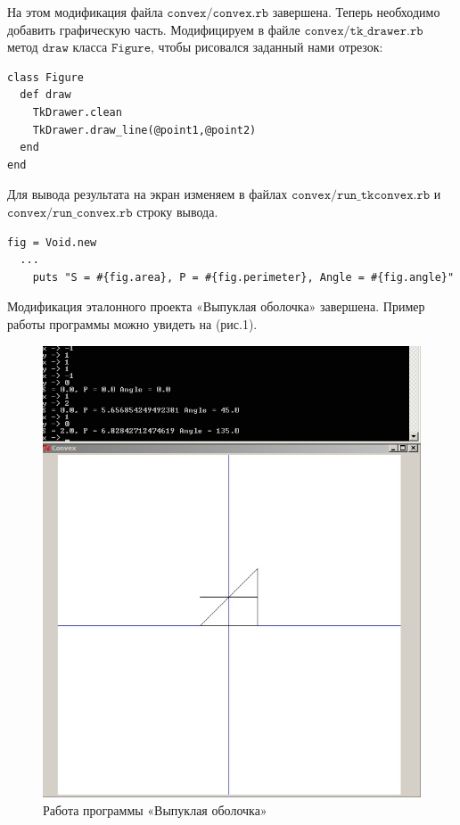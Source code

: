 На этом модификация файла $\texttt{convex/convex.rb}$ завершена. Теперь необходимо добавить графическую часть. Модифицируем в файле \sloppy $\texttt{convex/tk\_drawer.rb}$ метод $\texttt{draw}$ класса $\texttt{Figure}$, чтобы рисовался заданный нами отрезок:
\begin{small}
\begin{verbatim}
class Figure
  def draw
    TkDrawer.clean
    TkDrawer.draw_line(@point1,@point2)
  end
end
\end{verbatim}
\end{small}

Для вывода результата на экран изменяем в файлах $\texttt{convex/run\_tkconvex.rb}$ и $\texttt{convex/run\_convex.rb}$ строку вывода.
\begin{small}
\begin{verbatim}
fig = Void.new
  ...
    puts "S = #{fig.area}, P = #{fig.perimeter}, Angle = #{fig.angle}"
\end{verbatim}
\end{small}

Модификация эталонного проекта «Выпуклая оболочка» завершена. Пример работы программы можно увидеть на (рис.1).

\begin{figure}[ht!]
\begin{center}
\includegraphics[width=0.8\hsize]{images/screen1}
\end{center}
\caption{Работа программы «Выпуклая оболочка»}
\end{figure}
\newpage











